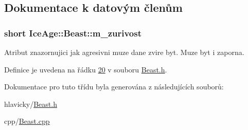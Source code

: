 \subsection{Dokumentace k datovým členům}
\subsubsection[{\texorpdfstring{m\+\_\+zurivost}{m_zurivost}}]{\setlength{\rightskip}{0pt plus 5cm}short Ice\+Age\+::\+Beast\+::m\+\_\+zurivost\hspace{0.3cm}{\ttfamily [private]}}\hypertarget{classIceAge_1_1Beast_a4ab89bf8c404db2afa13f83dd893098b}{}\label{classIceAge_1_1Beast_a4ab89bf8c404db2afa13f83dd893098b}


Atribut znazornujici jak agresivni muze dane zvire byt. Muze byt i zaporna. 



Definice je uvedena na řádku \hyperlink{Beast_8h_source_l00020}{20} v souboru \hyperlink{Beast_8h_source}{Beast.\+h}.



Dokumentace pro tuto třídu byla generována z následujících souborů\+:\begin{DoxyCompactItemize}
\item 
hlavicky/\hyperlink{Beast_8h}{Beast.\+h}\item 
cpp/\hyperlink{Beast_8cpp}{Beast.\+cpp}\end{DoxyCompactItemize}
